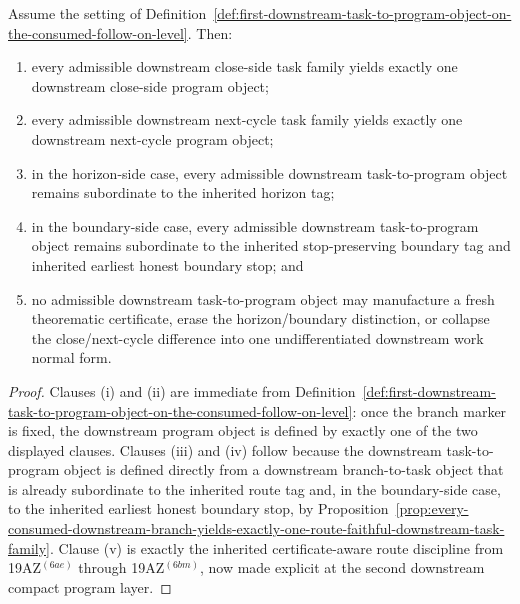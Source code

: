 \begin{proposition}
\label{prop:every-consumed-downstream-task-family-yields-exactly-one-compact-downstream-program-object}
Assume the setting of Definition~\ref{def:first-downstream-task-to-program-object-on-the-consumed-follow-on-level}. Then:
\begin{enumerate}[label=(\roman*)]
 \item every admissible downstream close-side task family yields exactly one downstream close-side program object;
 \item every admissible downstream next-cycle task family yields exactly one downstream next-cycle program object;
 \item in the horizon-side case, every admissible downstream task-to-program object remains subordinate to the inherited horizon tag;
 \item in the boundary-side case, every admissible downstream task-to-program object remains subordinate to the inherited stop-preserving boundary tag and inherited earliest honest boundary stop; and
 \item no admissible downstream task-to-program object may manufacture a fresh theorematic certificate, erase the horizon/boundary distinction, or collapse the close/next-cycle difference into one undifferentiated downstream work normal form.
\end{enumerate}
\end{proposition}

\begin{proof}
Clauses (i) and (ii) are immediate from Definition~\ref{def:first-downstream-task-to-program-object-on-the-consumed-follow-on-level}: once the branch marker is fixed, the downstream program object is defined by exactly one of the two displayed clauses. Clauses (iii) and (iv) follow because the downstream task-to-program object is defined directly from a downstream branch-to-task object that is already subordinate to the inherited route tag and, in the boundary-side case, to the inherited earliest honest boundary stop, by Proposition~\ref{prop:every-consumed-downstream-branch-yields-exactly-one-route-faithful-downstream-task-family}. Clause (v) is exactly the inherited certificate-aware route discipline from 19AZ$^{(6ae)}$ through 19AZ$^{(6bm)}$, now made explicit at the second downstream compact program layer.
\end{proof}

